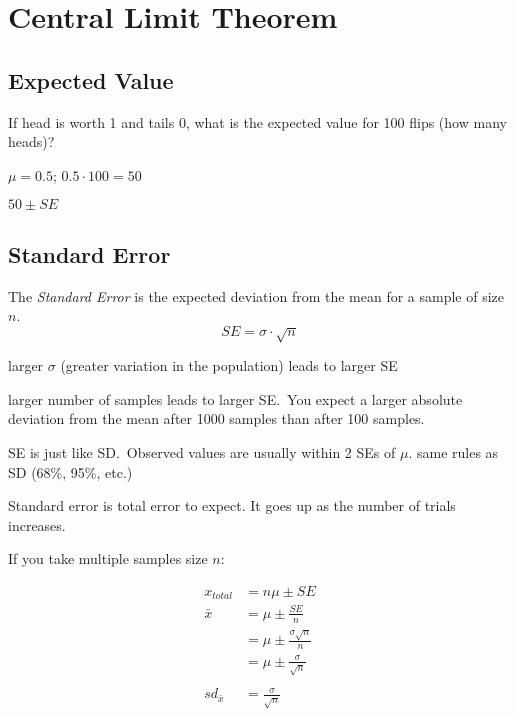 \documentclass[letterpaper,landscape]{exam}
\begin{document}
  \section{Central Limit Theorem}

  \subsection{Expected Value}
  If head is worth 1 and tails 0, what is the expected value for 100 flips (how many heads)?

  \begin{itemize*}
    \item $\mu = 0.5$; $0.5 \cdot 100 = 50$
    \item $50 \pm SE$
  \end{itemize*}

  \subsection{Standard Error}
  The {\em Standard Error\/} is the expected deviation from the mean for a sample of size $n$.
  \[
    SE = \sigma \cdot \sqrt{n}
  \]

  \begin{itemize*}
    \item larger $\sigma$ (greater variation in the population) leads to larger SE
    \item larger number of samples leads to larger SE.\ You expect a larger
      absolute deviation from the mean after 1000 samples than after 100
      samples.
    \item SE is just like SD.\ Observed values are usually within 2 SEs of $\mu$.
      same rules as SD (68\%, 95\%, etc.)
  \end{itemize*}

  Standard error is total error to expect. It goes up as the number of trials increases.

  If you take multiple samples size $n$:

  \begin{align*}
    x_{total} & = n \mu \pm SE \\
    \bar{x}   & = \mu \pm \frac{SE}{n} \\
              & = \mu \pm \frac{\sigma \sqrt{n}}{n} \\
              & = \mu \pm \frac{\sigma}{\sqrt{n}} \\
    \\
    sd_{\bar{x}} & = \frac{\sigma}{\sqrt{n}} \\
  \end{align*}
\end{document}
